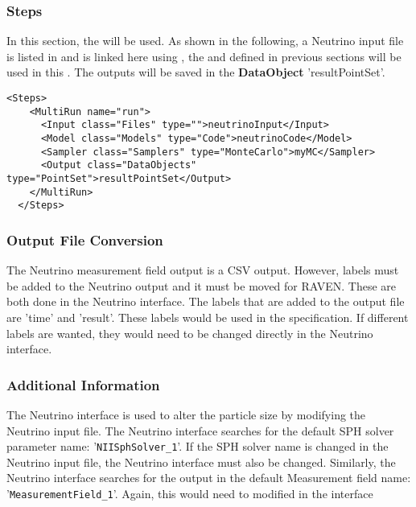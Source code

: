 \subsubsection{Steps}
In this section, the  will be used. As shown in the following, a Neutrino
input file is listed in  and is linked here using , the 
and  defined in previous sections will be used in this . The
outputs will be saved in the \textbf{DataObject} 'resultPointSet'.

\begin{lstlisting}[style=XML]
  <Steps>
    <MultiRun name="run">
      <Input class="Files" type="">neutrinoInput</Input>
      <Model class="Models" type="Code">neutrinoCode</Model>
      <Sampler class="Samplers" type="MonteCarlo">myMC</Sampler>
      <Output class="DataObjects" type="PointSet">resultPointSet</Output>
    </MultiRun>
  </Steps>
\end{lstlisting}

\subsubsection{Output File Conversion}
The Neutrino measurement field output is a CSV output. However, labels must be added to the Neutrino output
and it must be moved for RAVEN. These are both done in the Neutrino interface. The labels that are added to the
output file are 'time' and 'result'. These labels would be used in the  specification.
If different labels are wanted, they would need to be changed directly in the Neutrino interface.

\subsubsection{Additional Information}
The Neutrino interface is used to alter the particle size by modifying the Neutrino input file. The Neutrino interface
searches for the default SPH solver parameter name: '\texttt{NIISphSolver\_1}'. If the SPH solver name is changed in the
Neutrino input file, the Neutrino interface must also be changed. Similarly, the Neutrino interface searches for the
output in the default Measurement field name: '\texttt{MeasurementField\_1}'. Again, this would need to modified in the interface
